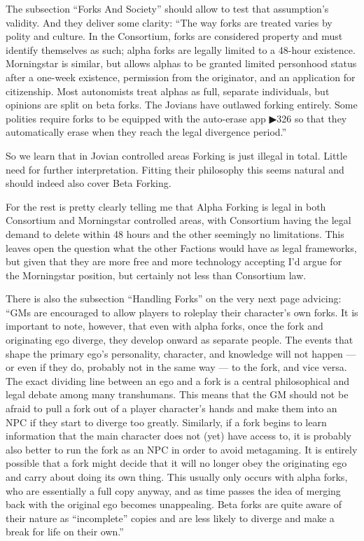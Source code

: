 The subsection “Forks And Society” should allow to test that assumption's validity. And they deliver some clarity: “The way forks are treated varies by polity and culture. In the Consortium, forks are considered property and must identify themselves as such; alpha forks are legally limited to a 48-hour existence. Morningstar is similar, but allows alphas to be granted limited personhood status after a one-week existence, permission from the originator, and an application for citizenship. Most autonomists treat alphas as full, separate individuals, but opinions are split on beta forks. The Jovians have outlawed forking entirely. Some polities require forks to be equipped with the auto-erase app ▶326 so that they automatically erase when they reach the legal divergence period.”

So we learn that in Jovian controlled areas Forking is just illegal in total. Little need for further interpretation. Fitting their philosophy this seems natural and should indeed also cover Beta Forking.

For the rest is pretty clearly telling me that Alpha Forking is legal in both Consortium and Morningstar controlled areas, with Consortium having the legal demand to delete within 48 hours and the other seemingly no limitations. This leaves open the question what the other Factions would have as legal frameworks, but given that they are more free and more technology accepting I'd argue for the Morningstar position, but certainly not less than Consortium law.

There is also the subsection “Handling Forks” on the very next page advicing: “GMs are encouraged to allow players to roleplay their character’s own forks. It is important to note, however, that even with alpha forks, once the fork and originating ego diverge, they develop onward as separate people. The events that shape the primary ego’s personality, character, and knowledge will not happen — or even if they do, probably not in the same way — to the fork, and vice versa. The exact dividing line between an ego and a fork is a central philosophical and legal debate among many transhumans. This means that the GM should not be afraid to pull a fork out of a player character’s hands and make them into an NPC if they start to diverge too greatly. Similarly, if a fork begins to learn information that the main character does not (yet) have access to, it is probably also better to run the fork as an NPC in order to avoid metagaming. It is entirely possible that a fork might decide that it will no longer obey the originating ego and carry about doing its own thing. This usually only occurs with alpha forks, who are essentially a full copy anyway, and as time passes the idea of merging back with the original ego becomes unappealing. Beta forks are quite aware of their nature as “incomplete” copies and are less likely to diverge and make a break for life on their own.”

